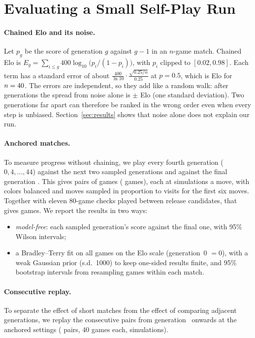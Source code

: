 \section{Evaluating a Small Self-Play Run}
\label{sec:evaluation}
\paragraph{Chained Elo and its noise.}
Let $p_g$ be the score of generation $g$ against $g-1$ in an $n$-game match. Chained Elo is
$E_g=\sum_{i\le g} 400\log_{10}\bigl(p_i/(1-p_i)\bigr)$, with $p_i$ clipped to $[0.02,0.98]$. Each term
has a standard error of about $\frac{400}{\ln 10}\cdot\frac{\sqrt{0.25/n}}{0.25}$ at $p=0.5$, which is
\valStepSE{} Elo for $n=40{}$. The errors are independent, so they add like a random walk: after
\valNGens{} generations the spread from noise alone is $\pm$\valWalkSD{} Elo (one standard deviation). Two
generations far apart can therefore be ranked in the wrong order even when every step is unbiased.
Section~\ref{sec:results} shows that noise alone does not explain our run.

\paragraph{Anchored matches.}
To measure progress without chaining, we play every fourth generation ($0,4,\dots,44$) against the next two
sampled generations and against the final generation \valNGens{}. This gives \valAnchoredPairs{} pairs of
\valEvalGames{} games (\valAnchoredGames{} games), each at \valAnchoredSims{} simulations a move, with
colors balanced and moves sampled in proportion to visits for the first six moves. Together with eleven
80-game checks played between release candidates, that gives \valHtoHGames{} games. We report the results
in two ways:
\begin{itemize}
  \item \emph{model-free}: each sampled generation's score against the final one, with 95\% Wilson intervals;
  \item a Bradley--Terry fit \citep{bradley1952rank} on all games on the Elo scale (generation~0 $=0$), with
        a weak Gaussian prior (s.d.\ 1000) to keep one-sided results finite, and 95\% bootstrap intervals
        from resampling games within each match.
\end{itemize}

\paragraph{Consecutive replay.}
To separate the effect of short matches from the effect of comparing adjacent generations, we replay the
consecutive pairs from generation~\valConsFrom{} onwards at the anchored settings (\valConsPairs{} pairs,
40 games each, \valAnchoredSims{} simulations).
